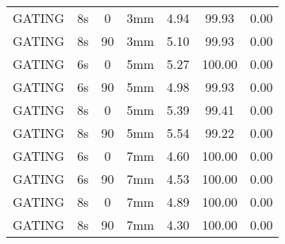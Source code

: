 \begin{table}[H]
\begin{tabular}{|c||c|c|c||c|c|c|}
GATING & 8s & 0 & 3mm & 4.94 & 99.93 & 0.00 \\
GATING & 8s & 90 & 3mm & 5.10 & 99.93 & 0.00 \\
GATING & 6s & 0 & 5mm & 5.27 & 100.00 & 0.00 \\
GATING & 6s & 90 & 5mm & 4.98 & 99.93 & 0.00 \\
GATING & 8s & 0 & 5mm & 5.39 & 99.41 & 0.00 \\
GATING & 8s & 90 & 5mm & 5.54 & 99.22 & 0.00 \\
GATING & 6s & 0 & 7mm & 4.60 & 100.00 & 0.00 \\
GATING & 6s & 90 & 7mm & 4.53 & 100.00 & 0.00 \\
GATING & 8s & 0 & 7mm & 4.89 & 100.00 & 0.00 \\
GATING & 8s & 90 & 7mm & 4.30 & 100.00 & 0.00 \\
    \hline\hline 
  \end{tabular}
\end{table}

\newpage

